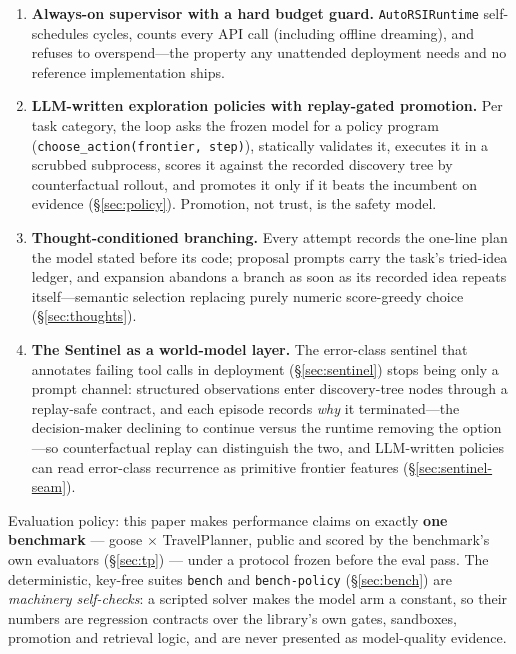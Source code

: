 \documentclass[11pt,a4paper]{article}
\newcommand{\hdr}[1]{\textbf{#1}}
\begin{document}
\begin{enumerate}
  \item \hdr{Always-on supervisor with a hard budget guard.}
  \texttt{AutoRSIRuntime} self-schedules cycles, counts every API call
  (including offline dreaming), and refuses to overspend---the property any
  unattended deployment needs and no reference implementation ships.
  \item \hdr{LLM-written exploration policies with replay-gated promotion.}
  Per task category, the loop asks the frozen model for a policy program
  (\texttt{choose\_action(frontier, step)}), statically validates it, executes
  it in a scrubbed subprocess, scores it against the recorded discovery tree
  by counterfactual rollout, and promotes it only if it beats the incumbent on
  evidence (\S\ref{sec:policy}). Promotion, not trust, is the safety model.
  \item \hdr{Thought-conditioned branching.}
  Every attempt records the one-line plan the model stated before its code;
  proposal prompts carry the task's tried-idea ledger, and expansion abandons
  a branch as soon as its recorded idea repeats itself---semantic selection
  replacing purely numeric score-greedy choice (\S\ref{sec:thoughts}).
  \item \hdr{The Sentinel as a world-model layer.}
  The error-class sentinel that annotates failing tool calls in deployment
  (\S\ref{sec:sentinel}) stops being only a prompt channel: structured
  observations enter discovery-tree nodes through a replay-safe contract, and
  each episode records \emph{why} it terminated---the decision-maker
  declining to continue versus the runtime removing the option---so
  counterfactual replay can distinguish the two, and LLM-written policies can
  read error-class recurrence as primitive frontier features
  (\S\ref{sec:sentinel-seam}).
\end{enumerate}

Evaluation policy: this paper makes performance claims on exactly
\textbf{one benchmark} --- goose $\times$ TravelPlanner, public and scored by
the benchmark's own evaluators (\S\ref{sec:tp}) --- under a protocol frozen
before the eval pass. The deterministic, key-free suites
\texttt{bench} and \texttt{bench-policy} (\S\ref{sec:bench}) are
\emph{machinery self-checks}: a scripted solver makes the model arm a
constant, so their numbers are regression contracts over the library's own
gates, sandboxes, promotion and retrieval logic, and are never presented as
model-quality evidence.
\end{document}
